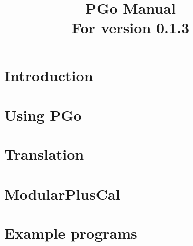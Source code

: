 \documentclass[notitlepage]{article}
\title{PGo Manual\\
	\normalsize{For version 0.1.3}}
\begin{document}
\maketitle

\section{Introduction}


\section{Using PGo}


\section{Translation}


\section{ModularPlusCal} \label{modularpcal}


\section{Example programs}

\end{document}
